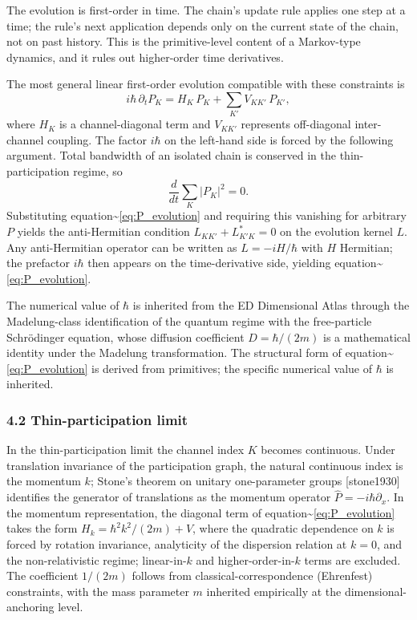 \documentclass[
  11pt,
]{article}
\begin{document}
The evolution is first-order in time. The chain's update rule applies
one step at a time; the rule's next application depends only on the
current state of the chain, not on past history. This is the
primitive-level content of a Markov-type dynamics, and it rules out
higher-order time derivatives.

The most general linear first-order evolution compatible with these
constraints is \begin{equation}
  i\hbar \, \partial_t P_K = H_K \, P_K + \sum_{K'} V_{KK'} \, P_{K'},
  \label{eq:P_evolution}
\end{equation} where \(H_K\) is a channel-diagonal term and \(V_{KK'}\)
represents off-diagonal inter-channel coupling. The factor \(i\hbar\) on
the left-hand side is forced by the following argument. Total bandwidth
of an isolated chain is conserved in the thin-participation regime, so
\begin{equation}
  \frac{d}{dt} \sum_K |P_K|^2 = 0.
\end{equation} Substituting
equation\textasciitilde{}\eqref{eq:P_evolution} and requiring this
vanishing for arbitrary \(P\) yields the anti-Hermitian condition
\(L_{KK'} + L_{K'K}^{*} = 0\) on the evolution kernel \(L\). Any
anti-Hermitian operator can be written as \(L = -iH/\hbar\) with \(H\)
Hermitian; the prefactor \(i\hbar\) then appears on the time-derivative
side, yielding equation\textasciitilde{}\eqref{eq:P_evolution}.

The numerical value of \(\hbar\) is inherited from the ED Dimensional
Atlas through the Madelung-class identification of the quantum regime
with the free-particle Schrödinger equation, whose diffusion coefficient
\(D = \hbar/(2m)\) is a mathematical identity under the Madelung
transformation. The structural form of
equation\textasciitilde{}\eqref{eq:P_evolution} is derived from
primitives; the specific numerical value of \(\hbar\) is inherited.

\subsubsection{4.2 Thin-participation
limit}\label{thin-participation-limit}

In the thin-participation limit the channel index \(K\) becomes
continuous. Under translation invariance of the participation graph, the
natural continuous index is the momentum \(k\); Stone's theorem on
unitary one-parameter groups {[}stone1930{]} identifies the generator of
translations as the momentum operator \(\hat{P} = -i\hbar \partial_x\).
In the momentum representation, the diagonal term of
equation\textasciitilde{}\eqref{eq:P_evolution} takes the form
\(H_k = \hbar^2 k^2 / (2m) + V\), where the quadratic dependence on
\(k\) is forced by rotation invariance, analyticity of the dispersion
relation at \(k=0\), and the non-relativistic regime; linear-in-\(k\)
and higher-order-in-\(k\) terms are excluded. The coefficient \(1/(2m)\)
follows from classical-correspondence (Ehrenfest) constraints, with the
mass parameter \(m\) inherited empirically at the dimensional-anchoring
level.
\end{document}
